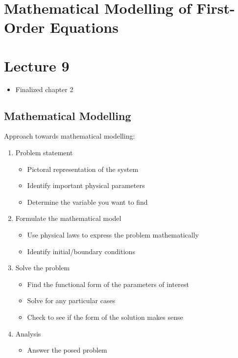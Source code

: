 \chapter{Mathematical Modelling of First-Order Equations}

\chapter*{Lecture 9}
\begin{recall}{}{}
\begin{itemize}
\item Finalized chapter 2 
\end{itemize}
\end{recall}




\section{Mathematical Modelling}

Approach towards mathematical modelling:
\begin{enumerate}
\item Problem statement
\begin{itemize}
\item Pictoral representation of the system
\item Identify important physical parameters
\item Determine the variable you want to find
\end{itemize}

\item Formulate the mathematical model
\begin{itemize}
\item Use physical laws to express the problem mathematically
\item Identify initial/boundary conditions
\end{itemize}
\item Solve the problem
\begin{itemize}
\item Find the functional form of the parameters of interest
\item Solve for any particular cases
\item Check to see if the form of the solution makes sense
\end{itemize}
\item Analysis
\begin{itemize}
\item Answer the posed problem
\end{itemize}
\end{enumerate}

